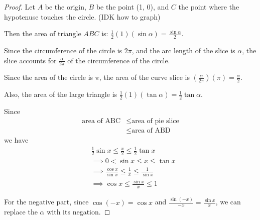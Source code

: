 \documentclass{article}
\begin{document}
\begin{proof}
    Let $A$ be the origin, $B$ be the point (1, 0), and $C$ the point where the hypotenuse touches the circle. (IDK how to graph)

    Then the area of triangle $ABC$ is: $\frac{1}{2}(1)(\sin \alpha) = \frac{\sin \alpha}{2}$.

    Since the circumference of the circle is $2\pi$, and the arc length of the slice is $\alpha$, the slice accounts for $\frac{\alpha}{2\pi}$ of the circumference of the circle. 

    Since the area of the circle is $\pi$, the area of the curve slice is $\left(\frac{\alpha}{2\pi}\right)(\pi) = \frac{\alpha}{2}$. 

    Also, the area of the large triangle is $\frac{1}{2}(1)(\tan \alpha) = \frac{1}{2}\tan \alpha$.

    Since \begin{align*}
        \text{area of ABC} &\leq \text{area of pie slice}\\
        &\leq \text{area of ABD}
    \end{align*} we have 
    \begin{align*}
        &\frac{1}{2}\sin x \leq \frac{x}{2} \leq \frac{1}{2} \tan x\\
        &\implies 0 < \sin x \leq x \leq \tan x\\
        &\implies \frac{\cos x}{\sin x} \leq \frac{1}{x} \leq \frac{1}{\sin x}\\
        &\implies \cos x \leq \frac{\sin x}{x} \leq 1
    \end{align*}

    For the negative part, since $\cos (-x) = \cos x$ and $\frac{\sin (-x)}{-x} = \frac{\sin x}{x}$, we can replace the $\alpha$ with its negation.
    
\end{proof}
\end{document}
